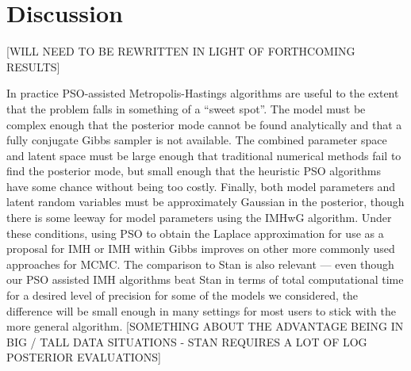 \documentclass[12pt]{article}
\begin{document}


\section{Discussion}\label{sec:discuss}

[WILL NEED TO BE REWRITTEN IN LIGHT OF FORTHCOMING RESULTS]

In practice PSO-assisted Metropolis-Hastings algorithms are useful to the extent that the problem falls in something of a ``sweet spot''. The model must be complex enough that the posterior mode cannot be found analytically and that a fully conjugate Gibbs sampler is not available. The combined parameter space and latent space must be large enough that traditional numerical methods fail to find the posterior mode, but small enough that the heuristic PSO algorithms have some chance without being too costly. Finally, both model parameters and latent random variables must be approximately Gaussian in the posterior, though there is some leeway for model parameters using the IMHwG algorithm. Under these conditions, using PSO to obtain the Laplace approximation for use as a proposal for IMH or IMH within Gibbs improves on other more commonly used approaches for MCMC. The comparison to Stan is also relevant --- even though our PSO assisted IMH algorithms beat Stan in terms of total computational time for a desired level of precision for some of the models we considered, the difference will be small enough in many settings for most users to stick with the more general algorithm. [SOMETHING ABOUT THE ADVANTAGE BEING IN BIG / TALL DATA SITUATIONS - STAN REQUIRES A LOT OF LOG POSTERIOR EVALUATIONS]
\end{document}
